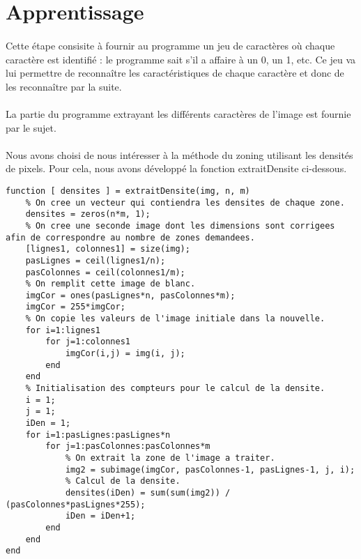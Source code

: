 \section{Apprentissage}

\paragraph{}
Cette étape consisite à fournir au programme un jeu de caractères où chaque caractère est identifié : le programme sait s'il a affaire à un 0, un 1, etc. 
Ce jeu va lui permettre de reconnaître les caractéristiques de chaque caractère et donc de les reconnaître par la suite. 

\paragraph{}
La partie du programme extrayant les différents caractères de l'image est fournie par le sujet. 

\paragraph{}
Nous avons choisi de nous intéresser à la méthode du zoning utilisant les densités de pixels. Pour cela, nous avons développé la fonction extraitDensite 
ci-dessous.

\begin{lstlisting}
function [ densites ] = extraitDensite(img, n, m)
	% On cree un vecteur qui contiendra les densites de chaque zone.
	densites = zeros(n*m, 1);
	% On cree une seconde image dont les dimensions sont corrigees afin de correspondre au nombre de zones demandees.
	[lignes1, colonnes1] = size(img);
	pasLignes = ceil(lignes1/n);
	pasColonnes = ceil(colonnes1/m);
	% On remplit cette image de blanc.
	imgCor = ones(pasLignes*n, pasColonnes*m);
	imgCor = 255*imgCor;
	% On copie les valeurs de l'image initiale dans la nouvelle.
	for i=1:lignes1
		for j=1:colonnes1
			imgCor(i,j) = img(i, j);
		end
	end
	% Initialisation des compteurs pour le calcul de la densite.
	i = 1;
	j = 1;
	iDen = 1;
	for i=1:pasLignes:pasLignes*n
		for j=1:pasColonnes:pasColonnes*m
			% On extrait la zone de l'image a traiter.
			img2 = subimage(imgCor, pasColonnes-1, pasLignes-1, j, i);
			% Calcul de la densite.
			densites(iDen) = sum(sum(img2)) / (pasColonnes*pasLignes*255);
			iDen = iDen+1;
		end
	end
end
\end{lstlisting}
